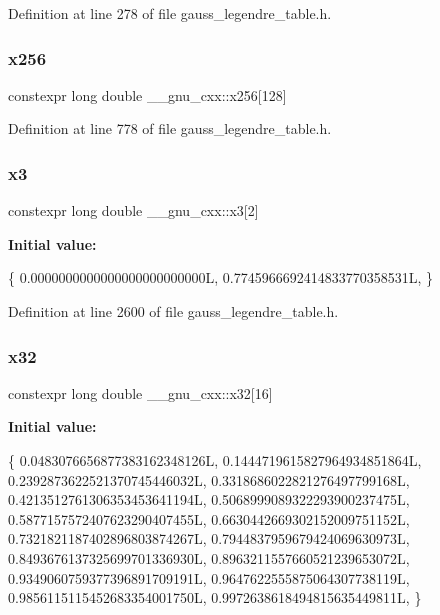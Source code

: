 Definition at line 278 of file gauss\+\_\+legendre\+\_\+table.\+h.

\mbox{\label{namespace____gnu__cxx_a916f81da20702c32146d4bd046ff2f64}} 
\subsubsection{\texorpdfstring{x256}{x256}}
{\footnotesize\ttfamily constexpr long double \+\_\+\+\_\+gnu\+\_\+cxx\+::x256\mbox{[}128\mbox{]}}



Definition at line 778 of file gauss\+\_\+legendre\+\_\+table.\+h.

\mbox{\label{namespace____gnu__cxx_a66d14d8d393a6dd426ebbca2e59a2ce1}} 
\subsubsection{\texorpdfstring{x3}{x3}}
{\footnotesize\ttfamily constexpr long double \+\_\+\+\_\+gnu\+\_\+cxx\+::x3\mbox{[}2\mbox{]}}

{\bfseries Initial value\+:}
\begin{DoxyCode}
\{
    0.0000000000000000000000000L,
    0.7745966692414833770358531L,
  \}
\end{DoxyCode}


Definition at line 2600 of file gauss\+\_\+legendre\+\_\+table.\+h.

\mbox{\label{namespace____gnu__cxx_aa2b1a25aef18450e1226996325a917f0}} 
\subsubsection{\texorpdfstring{x32}{x32}}
{\footnotesize\ttfamily constexpr long double \+\_\+\+\_\+gnu\+\_\+cxx\+::x32\mbox{[}16\mbox{]}}

{\bfseries Initial value\+:}
\begin{DoxyCode}
\{
    0.0483076656877383162348126L,
    0.1444719615827964934851864L,
    0.2392873622521370745446032L,
    0.3318686022821276497799168L,
    0.4213512761306353453641194L,
    0.5068999089322293900237475L,
    0.5877157572407623290407455L,
    0.6630442669302152009751152L,
    0.7321821187402896803874267L,
    0.7944837959679424069630973L,
    0.8493676137325699701336930L,
    0.8963211557660521239653072L,
    0.9349060759377396891709191L,
    0.9647622555875064307738119L,
    0.9856115115452683354001750L,
    0.9972638618494815635449811L,
  \}
\end{DoxyCode}


